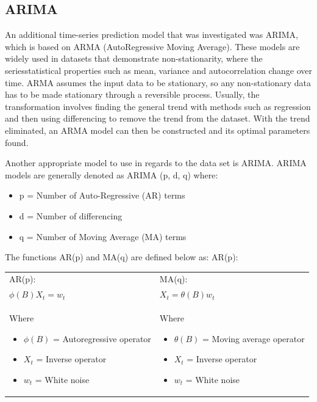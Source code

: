 \documentclass[12pt]{mcmthesis}
\begin{document}
    \subsection{ARIMA}
    An additional time-series prediction model that was investigated was ARIMA, which is based on ARMA (AutoRegressive Moving Average). These models are widely used in datasets that demonstrate non-stationarity, where the series\textquotesingle statistical properties such as mean, variance and autocorrelation change over time. ARMA assumes the input data to be stationary, so any non-stationary data has to be made stationary through a reversible process. Usually, the transformation involves finding the general trend with methods such as regression and then using differencing to remove the trend from the dataset. With the trend eliminated, an ARMA model can then be constructed and its optimal parameters found.

    Another appropriate model to use in regards to the data set is ARIMA. ARIMA models are generally denoted as ARIMA (p, d, q) where:
    \begin{itemize}[nosep]
        \item p = Number of Auto-Regressive (AR) terms
        \item d = Number of differencing
        \item q = Number of Moving Average (MA) terms
    \end{itemize}

    The functions AR(p) and MA(q) are defined below as:
    AR(p):

    \begin{tabular}{|*2{p{}|}}
        \hline
        AR(p):                       & MA(q):                   \\
        \quad ${\phi (B) X_t = w_t}$ & ${X_t = \theta (B) w_t}$ \\[\baselineskip]
        Where
        \begin{itemize}[nosep]
            \item ${\phi (B)}$ = Autoregressive operator
            \item ${X_t}$ = Inverse operator
            \item ${w_t}$ = White noise
        \end{itemize}
        &
        Where
        \begin{itemize}[nosep]
            \item ${\theta (B)}$ = Moving average operator
            \item ${X_t}$ = Inverse operator
            \item ${w_t}$ = White noise
        \end{itemize}
        \\
        \hline
    \end{tabular}
\end{document}
